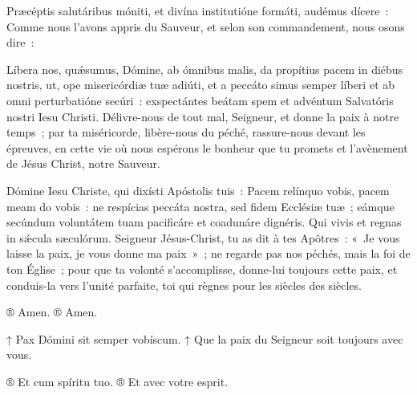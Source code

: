 \begin{paracol}{2}

\LigneParacol{0cm}
{Præcéptis salutáribus móniti, et divína institutióne formáti, audémus dícere~:}
{Comme nous l'avons appris du Sauveur, et selon son commandement, nous osons dire~:}

\end{paracol}


\begin{paracol}{2}

\LigneParacol{0cm}
{Líbera nos, quǽsumus, Dómine, ab ómnibus malis, da propítius pacem in diébus nostris, ut, ope misericórdiæ tuæ adiúti, et a peccáto simus semper líberi et ab omni perturbatióne secúri~: exspectántes beátam spem et advéntum Salvatóris nostri Iesu Christi.}
{Délivre-nous de tout mal, Seigneur, et donne la paix à notre temps~; par ta miséricorde, libère-nous du péché, rassure-nous devant les épreuves, en cette vie où nous espérons le bonheur que tu promets et l'avènement de Jésus Christ, notre Sauveur.}

\end{paracol}


\begin{paracol}{2}

\LigneParacol{0cm}
{Dómine Iesu Christe, qui dixísti Apóstolis tuis~: Pacem relínquo vobis, pacem meam do vobis~: ne respícias peccáta nostra, sed fidem Ecclésiæ tuæ~; eámque secúndum voluntátem tuam pacificáre et coadunáre dignéris. Qui vivis et regnas in sǽcula sæculórum.}
{Seigneur Jésus-Christ, tu as dit à tes Apôtres~: «~Je vous laisse la paix, je vous donne ma paix~»~; ne regarde pas nos péchés, mais la foi de ton Église~; pour que ta volonté s’accomplisse, donne-lui toujours cette paix, et conduis-la vers l’unité parfaite, toi qui règnes pour les siècles des siècles.}

\LigneParacol{0cm}
{® Amen.}
{® Amen.}

\LigneParacol{0cm}
{↑ Pax Dómini sit semper vobíscum.}
{↑ Que la paix du Seigneur soit toujours avec vous.}

\LigneParacol{0cm}
{® Et cum spíritu tuo.}
{® Et avec votre esprit.}

\end{paracol}
